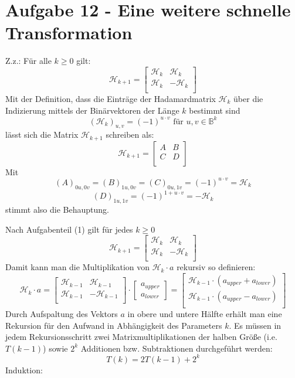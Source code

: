 \section*{Aufgabe 12 - Eine weitere schnelle Transformation}

\renewcommand{\H}{\mathcal{H}}
\begin{flushenum}
	\item Z.z.: Für alle $k \geq 0$ gilt:
	\[ \H_{k+1} = \begin{bmatrix}
		\H_k & \H_k \\
		\H_k & -\H_k \\
	\end{bmatrix} \]
	Mit der Definition, dass die Einträge der Hadamardmatrix $\H_k$ über die Indizierung
	mittels der Binärvektoren der Länge $k$ bestimmt sind
	\[ \left( \H_k \right)_{u,v} = (-1)^{u \cdot v} \text{ für } u,v \in \mathds{B}^k \]
	lässt sich die Matrix $\H_{k+1}$ schreiben als:
	\[ \H_{k+1} = \begin{bmatrix}
		A & B \\
		C & D \\
	\end{bmatrix} \]
	Mit
	\[ \left( A \right)_{0u,0v} = \left( B\right)_{1u, 0v} = \left( C \right)_{0u, 1v} = (-1)^{u \cdot v} = \H_k \]
	\[ \left( D \right)_{1u, 1v} = (-1)^{1 + u \cdot v} = - \H_k \]
	stimmt also die Behauptung.

	\item Nach Aufgabenteil (1) gilt für jedes $k \geq 0$
	\[ \H_{k+1} = \begin{bmatrix}
		\H_k & \H_k \\
		\H_k & -\H_k \\
	\end{bmatrix} \]
	Damit kann man die Multiplikation von $\H_k \cdot a$ rekursiv so definieren:
	\[ \H_k \cdot a = 
	\begin{bmatrix}
		\H_{k-1} & \H_{k-1} \\
		\H_{k-1} & -\H_{k-1} \\
	\end{bmatrix} \cdot
	\begin{bmatrix}
		a_{upper} \\
		a_{lower}
	\end{bmatrix} = 
	\begin{bmatrix}
		\H_{k-1} \cdot (a_{upper} + a_{lower}) \\
		\H_{k-1} \cdot (a_{upper} - a_{lower}) \\
	\end{bmatrix} \]
	Durch Aufspaltung des Vektors $a$ in obere und untere Hälfte erhält man
	eine Rekursion für den Aufwand in Abhängigkeit des Parameters $k$. Es
	müssen in jedem Rekursions\-schritt zwei Matrixmultiplikationen der
	halben Größe (i.e. $T(k-1)$) sowie $2^k$ Additionen bzw. Subtraktionen
	durchgeführt werden:
	\[ T(k) = 2 T(k-1) + 2^k \]
	Induktion:


\end{flushenum}
